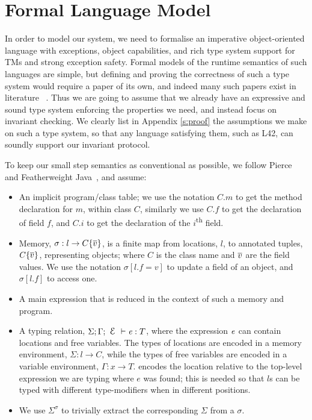 \section{Formal Language Model}
\label{s:formalism}

In order to model our system, we need to formalise an imperative object-oriented language
with exceptions, object capabilities, and rich type system
support for TMs and strong exception safety.
Formal models of the runtime semantics of such languages are simple, but 
defining and proving the correctness of such a type system would require a paper
of its own, and indeed many such papers exist in literature%
~\cite{ServettoEtAl13a,ServettoZucca15,GordonEtAl12,clebsch2015deny,JOT:issue_2011_01/article1}.
Thus we are going to assume that we already have an expressive and sound type system enforcing the properties we need, and instead focus on invariant checking.
We clearly list in Appendix \ref{s:proof} the assumptions we make on such a type system, so that any language satisfying them, such as L42, can soundly support our invariant protocol.

To keep our small step semantics as conventional as possible, we follow Pierce~\cite{pierce2002types} and Featherweight Java~\cite{IgarashiEtAl01}, and assume:
\SSI\begin{itemize}
	\item An implicit program/class table; we use the notation $C.m$ to get the method declaration for $m$, within class $C$, similarly we use $C.f$ to get the declaration of field $f$, and $C.i$ to get the declaration of the $i$\textsuperscript{th} field.
	\item Memory, $\sigma : l\rightarrow C\{\hspace{0.03ex} \overline{\hspace{-0.03ex}v\hspace{-0.03ex}} \hspace{0.03ex}\}${, is} a finite map from locations, $l$, to annotated tuples, $C\{\hspace{0.03ex} \overline{\hspace{-0.03ex}v\hspace{-0.03ex}} \hspace{0.03ex}\}$, representing objects; where $C$ is the class name and $\hspace{0.03ex} \overline{\hspace{-0.03ex}v\hspace{-0.03ex}} \hspace{0.03ex}$ are the field values.
	We use the notation $\sigma[l.f=v]$ to update a field of an object, and $\sigma[l.f]$ to access one.
	\item A main expression that is reduced in the context of such a memory and program.
	\item A typing relation, $\Sigma;\Gamma;\E\vdash\e:T$, where 
	the expression ${\mathit{e}}$ can contain locations and free variables. The types of locations are encoded in 
a memory environment, 
$\Sigma : l\rightarrow C$,
	while the types of free variables are encoded in
a variable environment, $\Gamma : x\rightarrow T$. \E encodes the location \IO{, }\IODel{(}relative to the top-level expression we are typing\IODel{)}\IO{,} where $e$ was found; this is needed so that $l$s can be typed with different type-modifiers when in different positions.
	\item We use $\Sigma^\sigma$ to trivially extract the corresponding $\Sigma$ from a $\sigma$.
\end{itemize}

